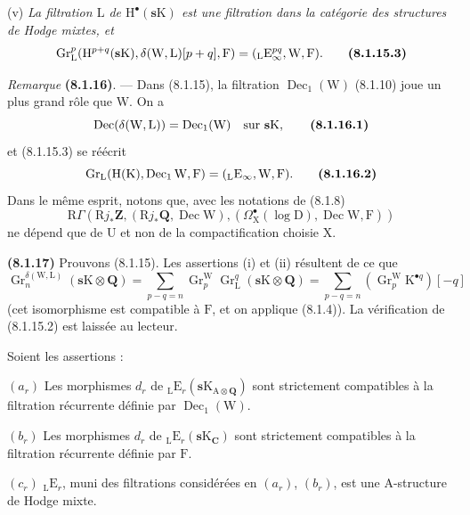 \documentclass[11pt,leqno]{article}
\begin{document}
(v) \textit{La filtration \(\mathrm{L}\) de \(\mathrm{H}^{\bullet}(\mathbf{s}\mathrm{K})\) est une filtration dans la catégorie des structures de Hodge mixtes, et}
\[
\operatorname{Gr}_{\mathrm{L}}^{p}
(\mathrm{H}^{p+q}(\mathbf{s}\mathrm{K}),
\delta(\mathrm{W},\mathrm{L})[p+q],\mathrm{F})
=
({}_{\mathrm{L}}\mathrm{E}_{\infty}^{pq},\mathrm{W},\mathrm{F}).
\tag*{\textbf{(8.1.15.3)}}
\]

\textit{Remarque} \textbf{(8.1.16)}. — Dans (8.1.15), la filtration \(\operatorname{Dec}_{1}(\mathrm{W})\) (8.1.10) joue un plus grand rôle que \(\mathrm{W}\). On a
\[
\operatorname{Dec}(\delta(\mathrm{W},\mathrm{L}))
=
\operatorname{Dec}_{1}(\mathrm{W})
\quad\text{sur }\mathbf{s}\mathrm{K},
\tag*{\textbf{(8.1.16.1)}}
\]
et (8.1.15.3) se réécrit
\[
\operatorname{Gr}_{\mathrm{L}}
(\mathrm{H}(\mathrm{K}),\operatorname{Dec}_{1}\mathrm{W},\mathrm{F})
=
({}_{\mathrm{L}}\mathrm{E}_{\infty},\mathrm{W},\mathrm{F}).
\tag*{\textbf{(8.1.16.2)}}
\]
Dans le même esprit, notons que, avec les notations de (8.1.8)
\[
\mathrm{R}\Gamma
(\mathrm{R}j_{\ast}\mathbf{Z},
(\mathrm{R}j_{\ast}\mathbf{Q},\operatorname{Dec}\mathrm{W}),
(\Omega_{\mathrm{X}}^\bullet(\log\mathrm{D}),
\operatorname{Dec}\mathrm{W},\mathrm{F}))
\]
ne dépend que de \(\mathrm{U}\) et non de la compactification choisie \(\mathrm{X}\).

\textbf{(8.1.17)} Prouvons (8.1.15). Les assertions (i) et (ii) résultent de ce que
\[
\operatorname{Gr}_{n}^{\delta(\mathrm{W},\mathrm{L})}
(\mathbf{s}\mathrm{K}\otimes\mathbf{Q})
=
\sum_{p-q=n}
\operatorname{Gr}_{p}^{\mathrm{W}}\operatorname{Gr}_{\mathrm{L}}^{q}
(\mathbf{s}\mathrm{K}\otimes\mathbf{Q})
=
\sum_{p-q=n}
(\operatorname{Gr}_{p}^{\mathrm{W}}\mathrm{K}^{\bullet q})[-q]
\]
(cet isomorphisme est compatible à \(\mathrm{F}\), et on applique (8.1.4)). La vérification de (8.1.15.2) est laissée au lecteur.

Soient les assertions :

\((a_{r})\) Les morphismes \(d_{r}\) de \({}_{\mathrm{L}}\mathrm{E}_{r}(\mathbf{s}\mathrm{K}_{\mathrm{A}\otimes\mathbf{Q}})\) sont strictement compatibles à la filtration récurrente définie par \(\operatorname{Dec}_{1}(\mathrm{W})\).

\((b_{r})\) Les morphismes \(d_{r}\) de \({}_{\mathrm{L}}\mathrm{E}_{r}(\mathbf{s}\mathrm{K}_{\mathbf{C}})\) sont strictement compatibles à la filtration récurrente définie par \(\mathrm{F}\).

\((c_{r})\) \({}_{\mathrm{L}}\mathrm{E}_{r}\), muni des filtrations considérées en \((a_{r})\), \((b_{r})\), est une \(\mathrm{A}\)-structure de Hodge mixte.
\end{document}
